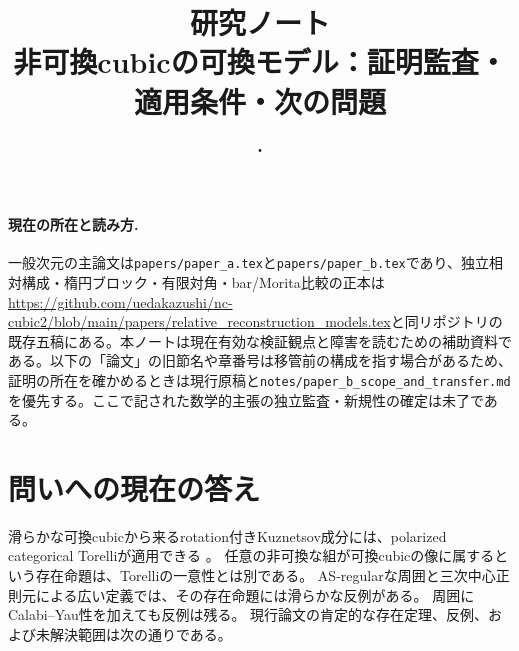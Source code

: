 
\title{研究ノート\\\large 非可換cubicの可換モデル：証明監査・適用条件・次の問題}
\author{}
\date{\DocDate・\DocVersion}

\maketitle
\paragraph{現在の所在と読み方.} 一般次元の主論文は\texttt{papers/paper\_a.tex}と\texttt{papers/paper\_b.tex}であり、独立相対構成・楕円ブロック・有限対角・bar/Morita比較の正本は\url{https://github.com/uedakazushi/nc-cubic2/blob/main/papers/relative_reconstruction_models.tex}と同リポジトリの既存五稿にある。本ノートは現在有効な検証観点と障害を読むための補助資料である。以下の「論文」の旧節名や章番号は移管前の構成を指す場合があるため、証明の所在を確かめるときは現行原稿と\texttt{notes/paper\_b\_scope\_and\_transfer.md}を優先する。ここで記された数学的主張の独立監査・新規性の確定は未了である。
\tableofcontents

\section{問いへの現在の答え}

滑らかな可換cubicから来るrotation付きKuznetsov成分には、polarized categorical
Torelliが適用できる \cite[Theorem 1.7]{LZ}。
任意の非可換な組が可換cubicの像に属するという存在命題は、Torelliの一意性とは別である。
AS-regularな周囲と三次中心正則元による広い定義では、その存在命題には滑らかな反例がある。
周囲にCalabi--Yau性を加えても反例は残る。
現行論文の肯定的な存在定理、反例、および未解決範囲は次の通りである。


